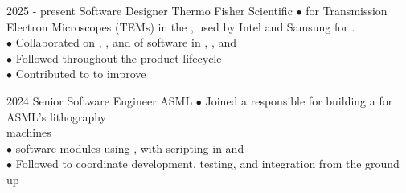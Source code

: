 \documentclass[9pt]{developercv} %
\newcommand{\myHilight}[2]{\tcbtp{\textit{\color{#1}{#2}}}}
\begin{document}
\begin{entrylist}
    \vspace{-1.2em}
    \entry
        {2025 - present}
        {Software Designer}
        {Thermo Fisher Scientific}
        {
            $\bullet$ \myHilight{textcolor}{Developed and maintained automation software} for 
                      Transmission Electron Microscopes (TEMs) 
                      \hspace*{0.7em} in the \myHilight{textcolor}{semiconductor field}, used 
                      by Intel and Samsung for \myHilight{textcolor}{anomaly detection in microchips}.\\
            $\bullet$ Collaborated on \myHilight{textcolor}{design}, 
                      \myHilight{textcolor}{development}, and 
                      \myHilight{textcolor}{testing} 
                      of software in \myHilight{textcolor}{C/C++}, \myHilight{textcolor}{Python}, 
                      and \myHilight{textcolor}{Bash}\\
            $\bullet$ Followed \myHilight{textcolor}{Agile methodologies} throughout the product 
                      lifecycle\\
            $\bullet$ Contributed to \myHilight{textcolor}{optics automation solutions} to 
                      improve \myHilight{textcolor}{system efficiency and robustness}\\
         }

    \entry
        {2024}
        {Senior Software Engineer}
		{ASML}
		{    
            $\bullet$ Joined a \myHilight{textcolor}{core team} responsible 
                      for building a \myHilight{textcolor}{new universal light system} 
                      for ASML’s lithography\\
                      \hspace*{0.7em}machines\\
            $\bullet$ \myHilight{textcolor}{Designed and implemented} 
                      software modules using \myHilight{textcolor}{C/C++}, 
                      with scripting in \myHilight{textcolor}{Python} 
                      and \myHilight{textcolor}{Bash}\\
            $\bullet$ Followed \myHilight{textcolor}{Agile practices} 
                      to coordinate development, testing, and 
                      integration from the ground up\\
        }


\end{entrylist}
\end{document}
